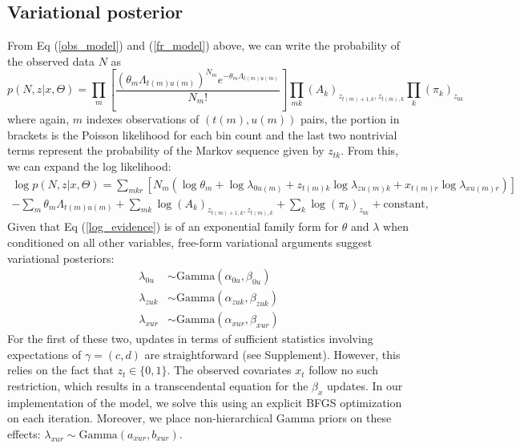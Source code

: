 \documentclass[10pt,letterpaper]{article}
\newcommand{\added}[1]{\textcolor{added}{#1}}
\begin{document}
\subsection*{Variational posterior}
From Eq (\ref{obs_model}) and (\ref{fr_model}) above, we can write the probability of the observed data $N$ as
\added{
\begin{equation}
    p(N, z|x, \Theta) = \prod_{m} \left[
        \frac{
        \left(\theta_m \Lambda_{t(m)u(m)}\right)^{N_m}
        e^{-\theta_m \Lambda_{t(m)u(m)}}
        }{N_m!}
    \right]
    \prod_{mk} (A_k)_{z_{t(m)+1, k}, z_{t(m), k}}
    \prod_k (\pi_k)_{z_{0k}}
\end{equation}
where again, $m$ indexes observations of $(t(m),u(m))$ pairs, the portion in brackets is the Poisson likelihood for each bin count and the last two nontrivial terms represent the probability of the Markov sequence given by $z_{tk}$. From this, we can expand the log likelihood:
}
\begin{multline}
    \label{log_evidence}
    \log p(N, z|x, \Theta) = \sum_{mkr} \left[
        N_m \left( \log \theta_m +
            \log \lambda_{0u(m)} +
            z_{t(m) k} \log \lambda_{zu(m) k} +
            x_{t(m) r} \log \lambda_{xu(m) r}
            \right)
    \right] \\
    - \sum_m \theta_m \Lambda_{t(m) u(m)} +
    \sum_{mk} \log (A_k)_{z_{t(m)+1, k}, z_{t(m), k}} +
    \sum_k \log (\pi_k)_{z_{0k}} + \text{constant,}
\end{multline}
Given that Eq (\ref{log_evidence}) is of an exponential family form for $\theta$ and $\lambda$ when conditioned on all other variables, free-form variational arguments \cite{Wainwright2008-ii} suggest variational posteriors:
\begin{align}
    \label{lambda0}
    \lambda_{0u} &\sim \text{Gamma}(\alpha_{0u}, \beta_{0u}) \\
    \label{lambdaz}
    \lambda_{zuk} &\sim \text{Gamma}(\alpha_{zuk}, \beta_{zuk}) \\
    \label{lambdax}
    \lambda_{xur} &\sim \text{Gamma}(\alpha_{xur}, \beta_{xur})
\end{align}
For the first of these two, updates in terms of sufficient statistics involving expectations of $\gamma = (c, d)$ are straightforward (see Supplement). However, this relies on the fact that $z_t \in \lbrace0, 1\rbrace$. The observed covariates $x_t$ follow no such restriction, which results in a transcendental equation for the $\beta_x$ updates. In our implementation of the model, we solve this using an explicit BFGS optimization on each iteration. Moreover, we place non-hierarchical Gamma priors on these effects: $\lambda_{xur} \sim \text{Gamma}(a_{xur}, b_{xur})$.
\end{document}
